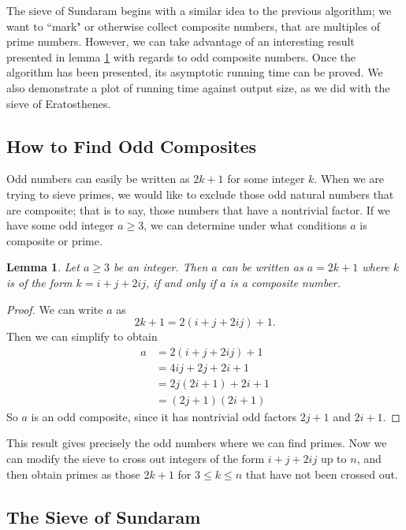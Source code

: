 \documentclass{amsart}
\newtheorem{lem}{Lemma}
\theoremstyle{definition}
\theoremstyle{case}
\begin{document}
	The sieve of Sundaram begins with a similar idea to the previous algorithm; we want to ``mark" or otherwise collect composite numbers, that are multiples of prime numbers. However, we can take advantage of an interesting result presented in lemma \ref{ijstuff} with regards to odd composite numbers.
	Once the algorithm has been presented, its asymptotic running time can be proved. We also demonstrate a plot of running time against output size, as we did with the sieve of Eratosthenes.
	
	\subsection{How to Find Odd Composites}
	
	Odd numbers can easily be written as $2k+1$ for some integer $k$. When we are trying to sieve primes, we would like to exclude those odd natural numbers that are composite; that is to say, those numbers that have a nontrivial factor. If we have some odd integer $a\geq3$, we can determine under what conditions $a$ is composite or prime.
	
	\begin{lem}\label{ijstuff}
		Let $a\geq3$ be an integer. Then $a$ can be written as $a = 2k+1$ where $k$ is of the form $k=i+j+2ij$, if and only if $a$ is a composite number.
	\end{lem}
	\begin{proof}
		We can write $a$ as
		$$ 2k + 1 = 2(i+j+2ij) + 1 . $$
		Then we can simplify to obtain
		\begin{equation*}
		\begin{split}
		a &= 2(i+j+2ij) + 1 \\
		  &= 4ij + 2j + 2i + 1 \\
		  &= 2j(2i+1) + 2i + 1 \\
		  &= (2j+1)(2i+1)
		\end{split}
		\end{equation*}
		So $a$ is an odd composite, since it has nontrivial odd factors $2j+1$ and $2i+1$.
	\end{proof}

	This result gives precisely the odd numbers where we can find primes. Now we can modify the sieve to cross out integers of the form $i+j+2ij$ up to $n$, and then obtain primes as those $2k+1$ for $3 \leq k \leq n$ that have not been crossed out.
	
	\subsection{The Sieve of Sundaram}
	
\end{document}

